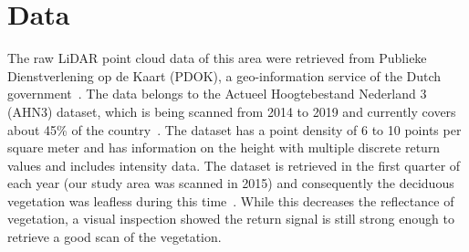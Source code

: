 \section{Data}
The raw LiDAR point cloud data of this area were retrieved from Publieke Dienstverlening op de Kaart (PDOK), a geo-information service of the Dutch government~\citep{PDOK2016AHN3}. The data belongs to the Actueel Hoogtebestand Nederland 3 (AHN3) dataset, which is being scanned from 2014 to 2019 and currently covers about 45\% of the country~\citep{AHN2016inwinjaren, PDOK2016AHN3}. The dataset has a point density of 6 to 10 points per square meter and has information on the height with multiple discrete return values and includes intensity data. The dataset is retrieved in the first quarter of each year (our study area was scanned in 2015) and consequently the deciduous vegetation was leafless during this time~\citep{AHN2016inwinjaren}. While this decreases the reflectance of vegetation, a visual inspection showed the return signal is still strong enough to retrieve a good scan of the vegetation.